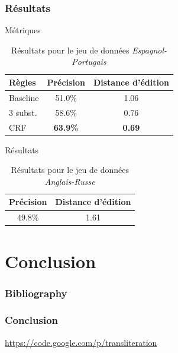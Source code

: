 \documentclass{beamer}
\begin{document}
\begin{frame}
\frametitle{Résultats}
\begin{block}{Métriques}
\begin{center}
\begin{table}[H]
\caption{Résultats pour le jeu de données \emph{Espagnol-Portugais} }
\begin{tabular}{|l|c|c|}
\hline
Règles&Précision&Distance d'édition\\
\hline
Baseline&51.0\%&1.06\\
\hline
3 subst.&58.6\%&0.76\\
\hline
CRF&\textbf{63.9\%}&\textbf{0.69}\\
\hline
\end{tabular}
\end{table}
\end{center}
\end{block}

\begin{block}{Résultats}
\begin{center}
\begin{table}[H]
\caption{Résultats pour le jeu de données \emph{Anglais-Russe} }
\begin{center}
\begin{tabular}{|c|c|}
\hline
Précision&Distance d'édition\\
\hline
49.8\%&1.61\\
\hline
\end{tabular}
\end{center}
\end{table}
\end{center}
\end{block}

\end{frame}

\section{Conclusion}
\begin{frame}
\tableofcontents[currentsection]
\end{frame}
\begin{frame}
    \frametitle{Bibliography}
    {\fontsize{0.8em}{1em}
    \nocite{*}
    
    }
\end{frame}

\begin{frame}
    \frametitle{Conclusion}
    \url{https://code.google.com/p/transliteration}
\end{frame}
\end{document}
